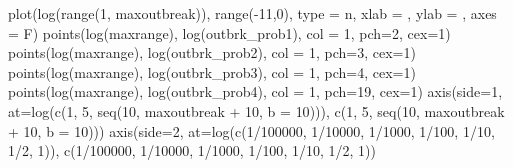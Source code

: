 \documentclass[
]{article}
\newenvironment{Shaded}{\begin{snugshade}}{\end{snugshade}}
\newcommand{\AttributeTok}[1]{\textcolor[rgb]{0.77,0.63,0.00}{#1}}
\newcommand{\DecValTok}[1]{\textcolor[rgb]{0.00,0.00,0.81}{#1}}
\newcommand{\FunctionTok}[1]{\textcolor[rgb]{0.00,0.00,0.00}{#1}}
\newcommand{\NormalTok}[1]{#1}
\newcommand{\SpecialCharTok}[1]{\textcolor[rgb]{0.00,0.00,0.00}{#1}}
\newcommand{\StringTok}[1]{\textcolor[rgb]{0.31,0.60,0.02}{#1}}
\begin{document}
\begin{Shaded}
\begin{Highlighting}[]
\FunctionTok{plot}\NormalTok{(}\FunctionTok{log}\NormalTok{(}\FunctionTok{range}\NormalTok{(}\DecValTok{1}\NormalTok{, maxoutbreak)), }\FunctionTok{range}\NormalTok{(}\SpecialCharTok{{-}}\DecValTok{11}\NormalTok{,}\DecValTok{0}\NormalTok{), }\AttributeTok{type =} \StringTok{\textquotesingle{}n\textquotesingle{}}\NormalTok{, }\AttributeTok{xlab =} \StringTok{\textquotesingle{}\textquotesingle{}}\NormalTok{, }\AttributeTok{ylab =} \StringTok{\textquotesingle{}\textquotesingle{}}\NormalTok{, }\AttributeTok{axes =}\NormalTok{ F)}
  \FunctionTok{points}\NormalTok{(}\FunctionTok{log}\NormalTok{(maxrange), }\FunctionTok{log}\NormalTok{(outbrk\_prob1), }\AttributeTok{col =} \DecValTok{1}\NormalTok{, }\AttributeTok{pch=}\DecValTok{2}\NormalTok{, }\AttributeTok{cex=}\DecValTok{1}\NormalTok{)}
  \FunctionTok{points}\NormalTok{(}\FunctionTok{log}\NormalTok{(maxrange), }\FunctionTok{log}\NormalTok{(outbrk\_prob2), }\AttributeTok{col =} \DecValTok{1}\NormalTok{, }\AttributeTok{pch=}\DecValTok{3}\NormalTok{, }\AttributeTok{cex=}\DecValTok{1}\NormalTok{)}
  \FunctionTok{points}\NormalTok{(}\FunctionTok{log}\NormalTok{(maxrange), }\FunctionTok{log}\NormalTok{(outbrk\_prob3), }\AttributeTok{col =} \DecValTok{1}\NormalTok{, }\AttributeTok{pch=}\DecValTok{4}\NormalTok{, }\AttributeTok{cex=}\DecValTok{1}\NormalTok{)}
  \FunctionTok{points}\NormalTok{(}\FunctionTok{log}\NormalTok{(maxrange), }\FunctionTok{log}\NormalTok{(outbrk\_prob4), }\AttributeTok{col =} \DecValTok{1}\NormalTok{, }\AttributeTok{pch=}\DecValTok{19}\NormalTok{, }\AttributeTok{cex=}\DecValTok{1}\NormalTok{)}
  \FunctionTok{axis}\NormalTok{(}\AttributeTok{side=}\DecValTok{1}\NormalTok{, }\AttributeTok{at=}\FunctionTok{log}\NormalTok{(}\FunctionTok{c}\NormalTok{(}\DecValTok{1}\NormalTok{, }\DecValTok{5}\NormalTok{, }\FunctionTok{seq}\NormalTok{(}\DecValTok{10}\NormalTok{, maxoutbreak }\SpecialCharTok{+} \DecValTok{10}\NormalTok{, }\AttributeTok{b =} \DecValTok{10}\NormalTok{))), }\FunctionTok{c}\NormalTok{(}\DecValTok{1}\NormalTok{, }\DecValTok{5}\NormalTok{, }\FunctionTok{seq}\NormalTok{(}\DecValTok{10}\NormalTok{, maxoutbreak }\SpecialCharTok{+} \DecValTok{10}\NormalTok{, }\AttributeTok{b =} \DecValTok{10}\NormalTok{)))}
  \FunctionTok{axis}\NormalTok{(}\AttributeTok{side=}\DecValTok{2}\NormalTok{, }\AttributeTok{at=}\FunctionTok{log}\NormalTok{(}\FunctionTok{c}\NormalTok{(}\DecValTok{1}\SpecialCharTok{/}\DecValTok{100000}\NormalTok{, }\DecValTok{1}\SpecialCharTok{/}\DecValTok{10000}\NormalTok{, }\DecValTok{1}\SpecialCharTok{/}\DecValTok{1000}\NormalTok{, }\DecValTok{1}\SpecialCharTok{/}\DecValTok{100}\NormalTok{, }\DecValTok{1}\SpecialCharTok{/}\DecValTok{10}\NormalTok{, }\DecValTok{1}\SpecialCharTok{/}\DecValTok{2}\NormalTok{, }\DecValTok{1}\NormalTok{)), }\FunctionTok{c}\NormalTok{(}\DecValTok{1}\SpecialCharTok{/}\DecValTok{100000}\NormalTok{, }\DecValTok{1}\SpecialCharTok{/}\DecValTok{10000}\NormalTok{, }\DecValTok{1}\SpecialCharTok{/}\DecValTok{1000}\NormalTok{, }\DecValTok{1}\SpecialCharTok{/}\DecValTok{100}\NormalTok{, }\DecValTok{1}\SpecialCharTok{/}\DecValTok{10}\NormalTok{, }\DecValTok{1}\SpecialCharTok{/}\DecValTok{2}\NormalTok{, }\DecValTok{1}\NormalTok{))}

\end{Highlighting}
\end{Shaded}
\end{document}
